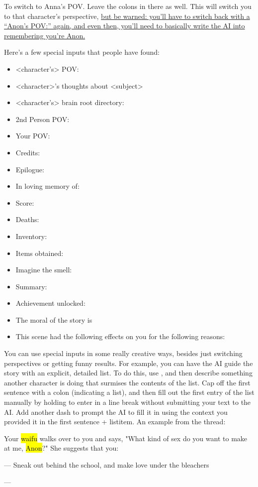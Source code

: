 \documentclass[Avsfag-main.tex]{subfiles}
\begin{document}
To switch to Anna's POV. Leave the colons in there as well. This will
switch you to that character's perspective, \ul{but be warned: you'll
have to switch back with a \story ``Anon's POV:'' again, and even then,
you'll need to basically write the AI into remembering you're Anon.}

Here's a few special inputs that people have found:

\begin{itemize}
\item
  \textless character's\textgreater{} POV:
\item
  \textless character\textgreater's thoughts about
  \textless subject\textgreater{}
\item
  \textless character's\textgreater{} brain root directory:
\item
  2nd Person POV:
\item
  Your POV:
\item
  Credits:
\item
  Epilogue:
\item
  In loving memory of:
\item
  Score:
\item
  Deaths:
\item
  Inventory:
\item
  Items obtained:
\item
  Imagine the smell:
\item
  Summary:
\item
  Achievement unlocked:
\item
  The moral of the story is
\item
  This scene had the following effects on you for the following reasons:
\end{itemize}

You can use special inputs in some really creative ways, besides just switching perspectives or getting funny results.
For example, you can have the AI guide the story with an explicit, detailed list.
To do this, use \story, and then describe something another character is doing that surmises the contents of the list.
Cap off the first sentence with a colon (indicating a list), and then fill out the first entry of the list manually by holding \keys{\shift + \return} to enter in a line break without submitting your text to the AI.
Add another dash to prompt the AI to fill it in using the context you provided it in the first sentence + listitem. An example from the thread:

\begin{storyb}
	\story Your \hl{waifu} walks over to you and says, "What kind of sex do you want to make at me, \hl{Anon}?"
She suggests that you:

— Sneak out behind the school, and make love under the bleachers

— 
\end{storyb}
\end{document}

